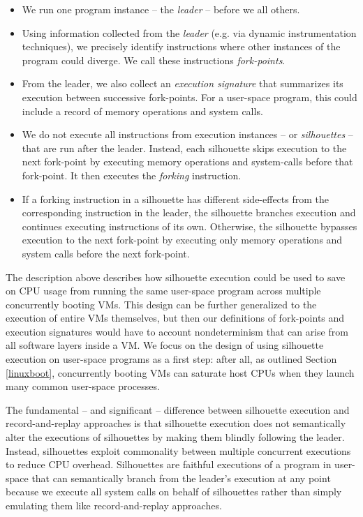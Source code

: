 \begin{itemize}
\item We run one program instance -- the {\em leader} -- before
we all others.
\item Using information collected from the {\em leader} (e.g.
via dynamic instrumentation techniques), 
we precisely identify instructions where
other instances of the program could diverge.
We call these instructions {\em fork-points}.
\item From the leader, we also collect an {\em execution signature} 
that summarizes its execution between successive
fork-points. For a user-space program, this could
include a record of memory operations and 
system calls.
\item We do not execute all instructions from execution
instances -- or {\em silhouettes} -- that are run
after the leader. Instead, each silhouette skips execution to
the next fork-point by executing memory
operations and system-calls before that fork-point. 
It then executes the {\em forking} instruction.
\item If a forking instruction
in a silhouette has different side-effects from
the corresponding instruction in the leader, 
the silhouette branches execution and continues
executing instructions of its own. 
Otherwise, the silhouette bypasses
execution to the next fork-point by
executing only memory operations and
system calls before the next fork-point.
\end{itemize}

The description above describes how silhouette execution
could be used to save on CPU usage from running
the same user-space program across multiple concurrently
booting VMs. 
This design can be further generalized to the execution of entire
VMs themselves, but then our definitions of fork-points
and execution signatures would have to account nondeterminism that can
arise from all software layers inside a VM.
We focus on the design of 
using silhouette execution on user-space programs as 
a first step: after all, as outlined
Section \ref{linuxboot}, concurrently booting VMs
can saturate host CPUs when they launch many
common user-space processes. 

The fundamental -- and significant -- difference
between silhouette execution and record-and-replay
approaches is that silhouette execution
does not semantically alter the executions
of silhouettes by making them blindly following
the leader. Instead, silhouettes exploit commonality 
between multiple concurrent executions to reduce CPU 
overhead. Silhouettes are faithful executions of a program
in user-space that can semantically branch from the 
leader's execution at any point because we execute all system calls
on behalf of silhouettes rather than simply emulating them
like record-and-replay approaches.

